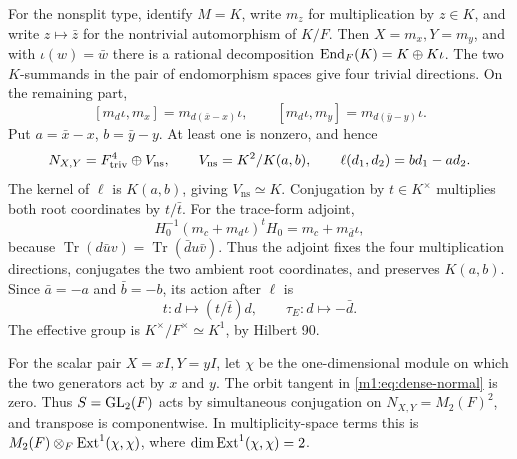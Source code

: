 For the nonsplit type, identify $M=K$, write $m_z$ for multiplication
by $z\in K$, and write $z\mapsto\bar z$ for the nontrivial automorphism
of $K/F$. Then $X=m_x,Y=m_y$, and with $\iota(w)=\bar w$ there is a rational decomposition
$\operatorname{End}_F(K)=K\oplus K\iota$. The two $K$-summands in the pair of
endomorphism spaces give four trivial directions. On the remaining
part,
\[
 [m_d\iota,m_x]=m_{d(\bar x-x)}\iota,\qquad
 [m_d\iota,m_y]=m_{d(\bar y-y)}\iota.
\]
Put $a=\bar x-x$, $b=\bar y-y$. At least one is nonzero, and hence
\begin{equation}\label{m1:eq:dense-nonsplit-quotient}
 N_{X,Y}=F^4_{\mathrm{triv}}\oplus V_{\mathrm{ns}},\qquad
 V_{\mathrm{ns}}=K^2/K(a,b),\qquad
 \ell(d_1,d_2)=bd_1-ad_2.
\end{equation}
The kernel of $\ell$ is $K(a,b)$, giving $V_{\mathrm{ns}}\simeq K$.
Conjugation by $t\in K^\times$ multiplies both root coordinates by
$t/\bar t$. For the trace-form adjoint,
\[
 H_0^{-1}(m_c+m_d\iota)^tH_0=m_c+m_{\bar d}\iota,
\]
because $\operatorname{Tr}(d\bar u v)=\operatorname{Tr}(\bar d u\bar v)$.
Thus the adjoint fixes the four multiplication directions, conjugates
the two ambient root coordinates, and preserves $K(a,b)$. Since
$\bar a=-a$ and $\bar b=-b$, its action after $\ell$ is
\begin{equation}\label{m1:eq:dense-nonsplit-action}
 t:d\longmapsto(t/\bar t)d,\qquad \tau_E:d\longmapsto-\bar d.
\end{equation}
The effective group is $K^\times/F^\times\simeq K^1$, by Hilbert 90.

For the scalar pair $X=xI,Y=yI$, let $\chi$ be the one-dimensional
module on which the two generators act by $x$ and $y$. The orbit tangent in
\eqref{m1:eq:dense-normal} is zero. Thus $S=\operatorname{GL}_2(F)$ acts by simultaneous
conjugation on $N_{X,Y}=M_2(F)^2$, and transpose is componentwise. In
multiplicity-space terms this is $M_2(F)\otimes_F\operatorname{Ext}^1(\chi,\chi)$,
where $\dim\operatorname{Ext}^1(\chi,\chi)=2$.

